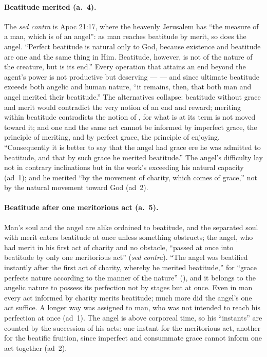 \paragraph{Beatitude merited (a.~4).} The \emph{sed contra} is
Apoc 21:17, where the heavenly Jerusalem has ``the measure of a man,
which is of an angel'': as man reaches beatitude by merit, so does the
angel. ``Perfect beatitude is natural only to God, because existence and
beatitude are one and the same thing in Him. Beatitude, however, is not
of the nature of the creature, but is its end.'' Every operation that
attains an end beyond the agent's power is not productive but deserving
---  --- and since ultimate beatitude exceeds both
angelic and human nature, ``it remains, then, that both man and angel
merited their beatitude.'' The alternatives collapse: beatitude without
grace and merit would contradict the very notion of an end and reward;
meriting within beatitude contradicts the notion of , for
what is at its term is not moved toward it; and one and the same act
cannot be informed by imperfect grace, the principle of meriting, and by
perfect grace, the principle of enjoying. ``Consequently it is better to
say that the angel had grace ere he was admitted to beatitude, and that
by such grace he merited beatitude.'' The angel's difficulty lay not in
contrary inclinations but in the work's exceeding his natural capacity
(ad~1); and he merited ``by the movement of charity, which comes of
grace,'' not by the natural movement toward God (ad~2).

\paragraph{Beatitude after one meritorious act (a.~5).} Man's soul and
the angel are alike ordained to beatitude, and the separated soul with
merit enters beatitude at once unless something obstructs; the angel,
who had merit in his first act of charity and no obstacle, ``passed at
once into beatitude by only one meritorious act'' (\emph{sed contra}).
``The angel was beatified instantly after the first act of charity,
whereby he merited beatitude,'' for ``grace perfects nature according to
the manner of the nature'' (), and it belongs to the angelic nature to possess its
perfection not by stages but at once. Even in man every act informed by
charity merits beatitude; much more did the angel's one act suffice. A
longer way was assigned to man, who was not intended to reach his
perfection at once (ad~1). The angel is above corporeal time, so his
``instants'' are counted by the succession of his acts: one instant for
the meritorious act, another for the beatific fruition, since imperfect
and consummate grace cannot inform one act together (ad~2).


